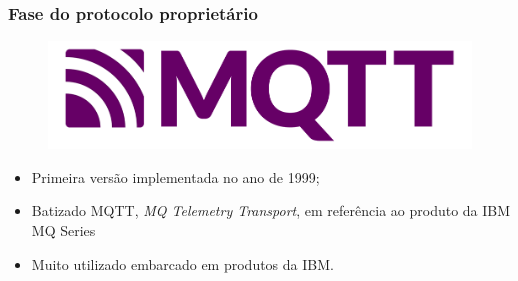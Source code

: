 \documentclass[12pt]{beamer}
\begin{document}
\begin{frame}
    \frametitle{Fase do protocolo proprietário}
    \begin{figure}[!htb]
        \centering
        \includegraphics[width=\textwidth]{logo_mqtt}
    \end{figure}
    \begin{itemize}
        \item Primeira versão implementada no ano de 1999;
        \item Batizado MQTT, \textit{MQ Telemetry Transport}, em referência ao produto da IBM MQ Series
        \item Muito utilizado embarcado em produtos da IBM.
    \end{itemize}
\end{frame}
\end{document}
